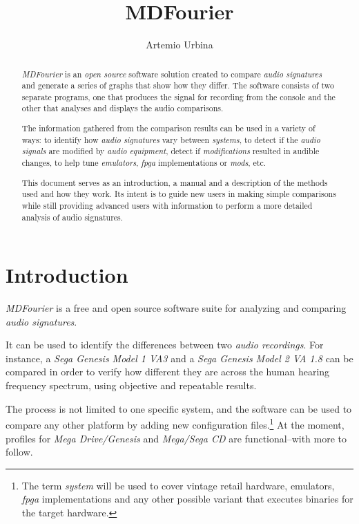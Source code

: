 \documentclass[10pt,a4paper]{report}
\title{MDFourier}
\author{Artemio Urbina}
\newcommand{\ac}[1]{\textit{\acrshort{#1}}}
\begin{document}
	
\begin{titlepage}
	\maketitle
	\thispagestyle{empty}
\end{titlepage}

\begin{abstract}
\textit{MDFourier} is an \textit{open source} software solution created to compare \textit{audio signatures} and generate a series of graphs that show how they differ. The software consists of two separate programs, one that produces the signal for recording from the console and the other that analyses and displays the audio comparisons. 

The information gathered from the comparison results can be used in a variety of ways: to identify how \textit{audio signatures} vary between \textit{systems}, to detect if the \textit{audio signals} are modified by \textit{audio equipment}, detect if \textit{modifications} resulted in audible changes, to help tune \textit{emulators}, \ac{fpga} implementations or \textit{mods}, etc.

This document serves as an introduction, a manual and a description of the methods used and how they work. Its intent is to guide new users in making simple comparisons while still providing advanced users with information to perform a more detailed analysis of audio signatures.
\end{abstract}

\tableofcontents

\chapter{Introduction}

\textit{MDFourier} is a free and open source software suite for analyzing and comparing \textit{audio signatures}.

It can be used to identify the differences between two \textit{audio recordings}.  For instance, a \textit{Sega Genesis Model 1 VA3} and a \textit{Sega Genesis Model 2 VA 1.8} can be compared in order to verify how different they are across the human hearing frequency spectrum, using objective and repeatable results.

The process is not limited to one specific system, and the software can be used to compare any other platform by adding new configuration files.\footnote{The term \textit{system} will be used to cover vintage retail hardware, emulators, \ac{fpga} implementations and any other possible variant that executes binaries for the target hardware.} At the moment, profiles for \textit{Mega Drive/Genesis} and \textit{Mega/Sega CD} are functional--with more to follow.
\end{document}
